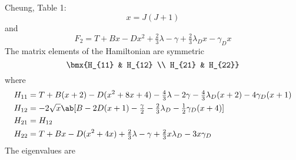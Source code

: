 \documentclass[11pt, twoside, fleqn]{report}
\begin{document}
Cheung, Table 1:
\begin{equation*}
    x = J(J + 1)
\end{equation*}
and
\begin{equation*}
    F_{2} = T + Bx - Dx^{2} + \tfrac{2}{3}\lambda - \gamma + \tfrac{2}{3}\lambda_{D}x - \gamma_{D}x
\end{equation*}
The matrix elements of the Hamiltonian are symmetric
\begin{equation*}
    \bmx{H_{11} & H_{12} \\ H_{21} & H_{22}}
\end{equation*}
where
\begin{align*}
    H_{11} & = T + B(x + 2) - D(x^{2} + 8x + 4) - \tfrac{4}{3}\lambda - 2\gamma - \tfrac{4}{3}\lambda_{D}(x + 2) - 4\gamma_{D}(x + 1) \\
    H_{12} & = -2\sqrt{x}\ab[B - 2D(x + 1) - \tfrac{\gamma}{2} - \tfrac{2}{3}\lambda_{D} - \tfrac{1}{2}\gamma_{D}(x + 4)]             \\
    H_{21} & = H_{12}                                                                                                                 \\
    H_{22} & = T + Bx - D(x^{2} + 4x) + \tfrac{2}{3}\lambda - \gamma + \tfrac{2}{3}x\lambda_{D} - 3x\gamma_{D}
\end{align*}
The eigenvalues are
\end{document}

